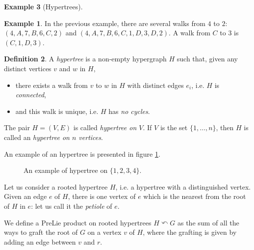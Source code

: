 \documentclass[11pt,leqno]{amsart}
\theoremstyle{definition}
\newtheorem{definition}{Definition}[subsection]
\newtheorem{example}[definition]{Example}
\theoremstyle{plain}
\begin{document}
\begin{example}[Hypertrees]
		
\begin{example} In the previous example, there are several walks from $4$ to $2$: $(4,A,7,B,6,C,2)$ and $(4,A,7,B,6,C,1,D,3,D,2)$. A walk from $C$ to $3$ is $(C,1,D,3)$.
\end{example}

\begin{definition} A \emph{hypertree} is a non-empty hypergraph $H$ such that, given any distinct vertices $v$ and $w$ in $H$, 
\begin{itemize}
\item there exists a walk from $v$ to $w$ in $H$ with distinct edges $e_i$, i.e. $H$ is \emph{connected},
\item and this walk is unique, i.e. $H$ has \emph{no cycles}. 
 \end{itemize}


The pair $H=(V,E)$ is called \emph{hypertree on $V$}. If $V$ is the set $ \{ 1, \ldots, n \}$, then $H$ is called an \emph{hypertree on $n$ vertices}.
\end{definition}

An example of an hypertree is presented in figure \ref{htfig}.

\begin{figure}

\begin{center}
\caption{An example of hypertree on $\{1,2,3,4\}$.\label{htfig} }
\end{center}

\end{figure}

Let us consider a rooted hypertree $H$, i.e. a hypertree with a distinguished vertex. Given an edge $e$ of $H$, there is one vertex of $e$ which is the nearest from the root of $H$ in $e$: let us call it the \emph{petiole} of $e$. 

We define a PreLie product on rooted hypertrees $H \curvearrowleft G$ as the sum of all the ways to graft the root of $G$ on a vertex $v$ of $H$, where the grafting is given by adding an edge between $v$ and $r$.


\end{example}
\end{document}
